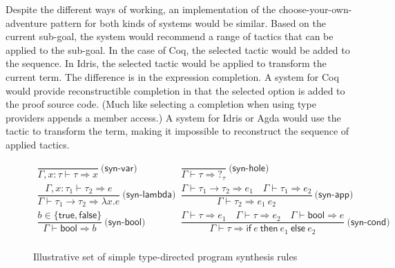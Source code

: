 \documentclass[anonymous, a4paper,UKenglish,cleveref, autoref, thm-restate]{lipics-v2021}
\newcommand{\ident}[1]{\textsf{#1}}
\begin{document}
Despite the different ways of working, an implementation of the choose-your-own-adventure
pattern for both kinds of systems would be similar. Based on the current sub-goal, the system
would recommend a range of tactics that can be applied to the sub-goal. In the
case of Coq, the selected tactic would be added to the sequence. In Idris, the selected tactic
would be applied to transform the current term. The difference is in the expression completion.
A system for Coq would provide reconstructible completion in that the selected option is added
to the proof source code. (Much like selecting a completion when using type providers appends a
member access.) A system for Idris or Agda would use the tactic to transform the term,
making it impossible to reconstruct the sequence of applied tactics.

\begin{figure}
\vspace{-1.5em}
\[
\begin{array}{lcl}
\dfrac{}{\Gamma,x:\tau \vdash \tau \Rightarrow x}~\ident{(syn-var)} &\quad&
\dfrac{}{\Gamma \vdash \tau \Rightarrow ?_\tau}~\ident{(syn-hole)}\\[2em]
\dfrac{\Gamma,x:\tau_1\vdash \tau_2 \Rightarrow e}{\Gamma \vdash \tau_1 \rightarrow \tau_2 \Rightarrow \lambda x.e}~\ident{(syn-lambda)}&&
\dfrac{\Gamma \vdash \tau_1\rightarrow\tau_2 \Rightarrow e_1 \quad \Gamma \vdash \tau_1 \Rightarrow e_2}{\Gamma \vdash \tau_2 \Rightarrow e_1~e_2}~\ident{(syn-app)}\\[2em]
\dfrac{b\in \{\ident{true},\ident{false}\} }{\Gamma \vdash \ident{bool} \Rightarrow b}~\ident{(syn-bool)} &\quad&
\dfrac{\Gamma \vdash \tau \Rightarrow e_1 \quad \Gamma \vdash \tau \Rightarrow e_2 \quad \Gamma \vdash \ident{bool} \Rightarrow e}{\Gamma \vdash \tau \Rightarrow \ident{if}~e~\ident{then}~e_1~\ident{else}~e_2}~\ident{(syn-cond)}\\
\end{array}
\]
\vspace{-0.25em}
\caption{Illustrative set of simple type-directed program synthesis rules}
\label{fig:synths}
\vspace{-0.25em}
\end{figure}
\end{document}
